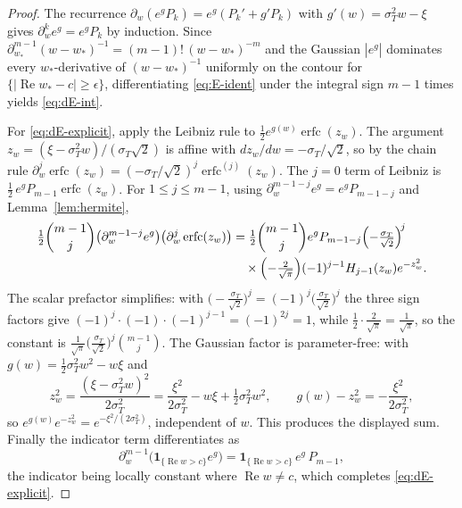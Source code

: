 \documentclass[11pt]{article}
\DeclareMathOperator{\Real}{Re}
\DeclareMathOperator{\erfc}{erfc}
\begin{document}
\begin{proof}
The recurrence $\partial_w(e^gP_k)=e^g(P_k'+g'P_k)$ with $g'(w)=\sigma_T^2w
-\xi$ gives $\partial_w^k e^g=e^gP_k$ by induction. Since
$\partial_{w_*}^{m-1}(w-w_*)^{-1}=(m-1)!\,(w-w_*)^{-m}$ and the Gaussian
$|e^g|$ dominates every $w_*$-derivative of $(w-w_*)^{-1}$ uniformly on the
contour for $\{|\Real w_*-c|\ge\epsilon\}$, differentiating
\eqref{eq:E-ident} under the integral sign $m-1$ times yields
\eqref{eq:dE-int}.

For \eqref{eq:dE-explicit}, apply the Leibniz rule to $\tfrac12 e^{g(w)}
\erfc(z_w)$. The argument $z_w=(\xi-\sigma_T^2w)/(\sigma_T\sqrt2)$ is affine
with $dz_w/dw=-\sigma_T/\sqrt2$, so by the chain rule
$\partial_w^{j}\erfc(z_w)=(-\sigma_T/\sqrt2)^{j}\erfc^{(j)}(z_w)$. The $j=0$
term of Leibniz is $\tfrac12\,e^gP_{m-1}\erfc(z_w)$. For $1\le j\le m-1$,
using $\partial_w^{m-1-j}e^g=e^gP_{m-1-j}$ and Lemma~\ref{lem:hermite},
\begin{equation}\label{eq:dE-term}
\begin{aligned}
\tfrac12\binom{m-1}{j}\bigl(\partial_w^{m-1-j}e^g\bigr)
\bigl(\partial_w^{j}\erfc(z_w)\bigr)
&=\tfrac12\binom{m-1}{j}e^gP_{m-1-j}
\Bigl(-\tfrac{\sigma_T}{\sqrt2}\Bigr)^{\!j}\\
&\quad\times\Bigl(-\tfrac{2}{\sqrt\pi}\Bigr)(-1)^{j-1}H_{j-1}(z_w)e^{-z_w^2}.
\end{aligned}
\end{equation}
The scalar prefactor simplifies: with
$\bigl(-\tfrac{\sigma_T}{\sqrt2}\bigr)^{j}=(-1)^j\bigl(\tfrac{\sigma_T}
{\sqrt2}\bigr)^{j}$ the three sign factors give
$(-1)^j\cdot(-1)\cdot(-1)^{j-1}=(-1)^{2j}=1$, while $\tfrac12\cdot
\tfrac{2}{\sqrt\pi}=\tfrac1{\sqrt\pi}$, so the constant is
$\tfrac1{\sqrt\pi}\bigl(\tfrac{\sigma_T}{\sqrt2}\bigr)^{j}\binom{m-1}{j}$.
The Gaussian factor is parameter-free: with $g(w)=\tfrac12\sigma_T^2w^2-w\xi$
and
\begin{equation}\label{eq:dE-cancel}
z_w^2=\frac{(\xi-\sigma_T^2w)^2}{2\sigma_T^2}
=\frac{\xi^2}{2\sigma_T^2}-w\xi+\tfrac12\sigma_T^2w^2,
\qquad
g(w)-z_w^2=-\frac{\xi^2}{2\sigma_T^2},
\end{equation}
so $e^{g(w)}e^{-z_w^2}=e^{-\xi^2/(2\sigma_T^2)}$, independent of $w$. This
produces the displayed sum. Finally the indicator term differentiates as
\begin{equation}\label{eq:dE-ind}
\partial_w^{m-1}\bigl(\mathbf1_{\{\Real w>c\}}e^g\bigr)
=\mathbf1_{\{\Real w>c\}}\,e^g\,P_{m-1},
\end{equation}
the indicator being locally constant where $\Real w\neq c$, which completes
\eqref{eq:dE-explicit}.
\end{proof}
\end{document}
